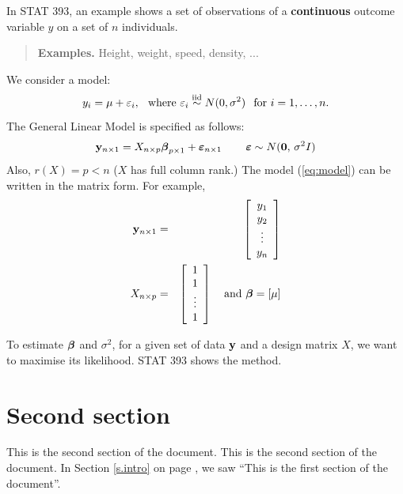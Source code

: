 \documentclass[12pt]{article}
\newcommand{\ubeta}{\mbox{\boldmath$\beta$}}
\begin{document}
In STAT 393, an example shows a set of observations of a {\bf continuous} outcome
variable $y$ on a set of $n$ individuals.
\begin{quote}
{\bf Examples.}  Height, weight, speed, density, ...
\end{quote}
We consider a model:
\begin{equation}
\label{eq:model}
   y_i =\mu + \varepsilon_i, \hspace{.1in} \mbox{where }
   \varepsilon_i \overset{\text{iid}}{\sim} N(0,\sigma^2)\hspace{.1in}
       \text{for } i=1,\ldots,n.
\end{equation}
The General Linear Model is specified as follows:
\[
  {\bf y}_{n\times 1}=
  {X}_{n\times p}\ubeta_{p\times 1}+\bm{\varepsilon}_{n\times 1}
  \hspace{.3in} \bm{\varepsilon}\sim N({\bf 0},\,\sigma^2{I})
\]
Also, $r({X})=p<n$ (${X}$ has full column rank.)  The model (\ref{eq:model}) can be written in the matrix form.  For example,
\begin{eqnarray*}
{\bf y}_{n\times 1} &=&  \left[\begin{array}{c}y_1\\ y_2\\ \vdots\\ y_n\end{array}\right]\\
X_{n\times p}&=&
 \left[\begin{array}{c}1\\ 1\\ \vdots\\ 1\end{array}\right]
\hspace{.1in} \mbox{ and }
\ubeta=\left[ \mu \right ]
\end{eqnarray*}


To estimate $\ubeta$ and $\sigma^2$, for a given set of data ${\bf y}$ and a
design matrix $X$, we want to maximise its likelihood.  STAT 393 shows the method.


\section{Second section}

\label{s.second}

This is the second section of the document. This is the second section of the 
document. In Section \ref{s.intro} on page \pageref{s.intro}, we saw ``This is 
the first section of the document''.
\end{document}
